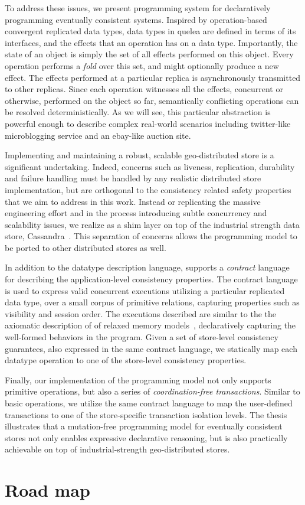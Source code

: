To address these issues, we present \quelea programming system for
declaratively programming eventually consistent systems. Inspired by
operation-based convergent replicated data types, data types in quelea are
defined in terms of its interfaces, and the effects that an operation has on a
data type. Importantly, the state of an object is simply the set of all effects
performed on this object. Every operation performs a \emph{fold} over this set,
and might optionally produce a new effect. The effects performed at a
particular replica is asynchronously transmitted to other replicas. Since each
operation witnesses all the effects, concurrent or otherwise, performed on the
object so far, semantically conflicting operations can be resolved
deterministically. As we will see, this particular abstraction is powerful
enough to describe complex real-world scenarios including twitter-like
microblogging service and an ebay-like auction site.

Implementing and maintaining a robust, scalable geo-distributed store is a
significant undertaking. Indeed, concerns such as liveness, replication,
durability and failure handling must be handled by any realistic distributed
store implementation, but are orthogonal to the consistency related safety
properties that we aim to address in this work. Instead or replicating the
massive engineering effort and in the process introducing subtle concurrency
and scalability issues, we realize \quelea as a shim layer on top of the
industrial strength data store, Cassandra~\cite{Lakshman2010}. This separation
of concerns allows the \quelea programming model to be ported to other
distributed stores as well.

In addition to the datatype description language, \quelea supports a
\emph{contract} language for describing the application-level consistency
properties. The contract language is used to express valid concurrent
executions utilizing a particular replicated data type, over a small corpus of
primitive relations, capturing properties such as visibility and session order.
The executions described are similar to the the axiomatic description of of
relaxed memory models~\cite{Demange2013}, declaratively capturing the
well-formed behaviors in the program. Given a set of store-level consistency
guarantees, also expressed in the same contract language, we statically map
each datatype operation to one of the store-level consistency properties.

Finally, our implementation of the \quelea programming model not only supports
primitive operations, but also a series of \emph{coordination-free
transactions}. Similar to basic operations, we utilize the same contract
language to map the user-defined transactions to one of the store-specific
transaction isolation levels. The thesis illustrates that a mutation-free
programming model for eventually consistent stores not only enables expressive
declarative reasoning, but is also practically achievable on top of
industrial-strength geo-distributed stores.

\section{Road map}
